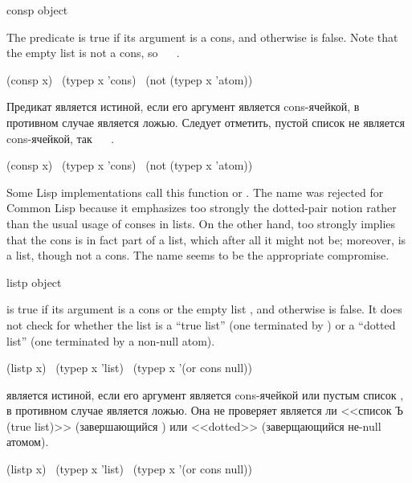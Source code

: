 \begin{defun}[Function]
consp object

The predicate  is true if its argument is a cons,
and otherwise is false.
Note that the empty list is not a cons, so
 \EQ\  \EV\ {\nil}.
\begin{lisp}
(consp x) \EQ\ (typep x 'cons) \EQ\ (not (typep x 'atom))
\end{lisp}

Предикат  является истиной, если его аргумент является cons-ячейкой,
в противном случае является ложью.
Следует отметить, пустой список не является cons-ячейкой, так 
 \EQ\  \EV\ {\nil}. 
\begin{lisp}
(consp x) \EQ\ (typep x 'cons) \EQ\ (not (typep x 'atom))
\end{lisp}

\beforenoterule
\begin{incompatibility}
Some Lisp implementations call this function
 or .  The name  was rejected for Common Lisp
because it emphasizes too strongly the dotted-pair notion rather than the
usual usage of conses in lists.  On the other hand,  too strongly
implies that the cons is in fact part of a list, which after all it might
not be; moreover, {\emptylist} is a list, though not a cons.
The name  seems to be the appropriate compromise.
\end{incompatibility}
\afternoterule
\end{defun}

\begin{defun}[Function]
listp object

 is true if its argument is a cons or the empty list {\emptylist},
and otherwise is false.  It does not check for whether the list
is a ``true list'' (one terminated by {\nil}) or a ``dotted list''
(one terminated by a non-null atom).
\begin{lisp}
(listp x) \EQ\ (typep x 'list) \EQ\ (typep x '(or cons null))
\end{lisp}

 является истиной, если его аргумент является cons-ячейкой или пустым
список {\emptylist}, в противном случае является ложью. Она не проверяет
является ли <<список Ъ (true list)>> (завершающийся {\nil}) или <<dotted>>
(заверщающийся не-null атомом).
\begin{lisp}
(listp x) \EQ\ (typep x 'list) \EQ\ (typep x '(or cons null))
\end{lisp}
\end{defun}

